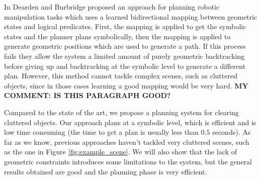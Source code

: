 In \citep{Dearden2014355} Dearden and Burbridge proposed an approach for planning robotic manipulation tasks which uses a learned bidirectional mapping between geometric states and logical predicates. First, the mapping is applied to get the symbolic states and the planner plans symbolically, then the mapping is applied to generate geometric positions which are used to generate a path. If this process
fails they allow the system a limited amount of purely geometric backtracking before giving up and backtracking at the symbolic level to generate a different plan. However, this method cannot tackle complex scenes, such as cluttered objects, since in those cases learning a good mapping would be very hard.   
\textbf{MY COMMENT: IS THIS PARAGRAPH GOOD?}

Compared to the state of the art, we propose a planning system for clearing cluttered objects. Our approach plans at a symbolic level, which is efficient and is low time consuming  (the time to get a plan is usually less than $0.5$ seconds). As far as we know, previous approaches haven't tackled very cluttered scenes, such as the one in Figure \ref{fig:example_scene}. We will also show that the lack of geometric constraints introduces some limitations to the system, but the general results obtained are good and the planning phase is very efficient.  


